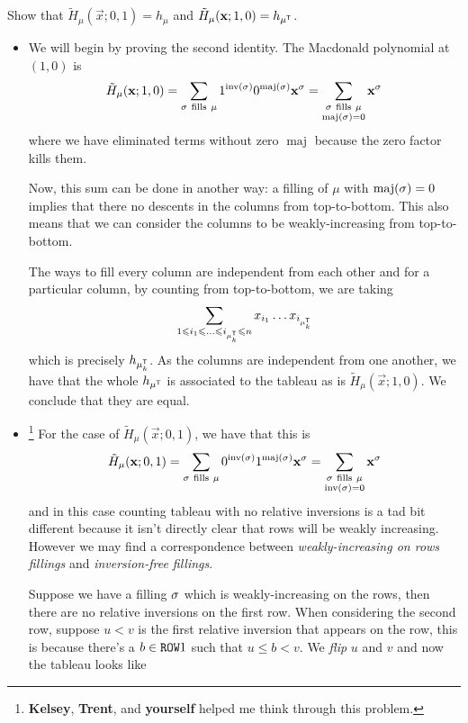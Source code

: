 \documentclass[12pt]{memoir}
\DeclareMathOperator{\inv}{inv}
\DeclareMathOperator{\maj}{maj}
\begin{document}
\begin{Ej}[Exercise 7.b]
    Show that $\tilde{H}_\mu(\vec{x};0,1)=h_\mu$ and $\tilde{H}_\mu(\mathbf{x};1,0)=h_{\mu^{\mathsf{T}}}$.
\end{Ej}

\begin{ptcbr}
    \begin{itemize}
        \item We will begin by proving the second identity. The Macdonald polynomial at $(1,0)$ is 
        $$\tilde{H}_\mu(\vec{x};1,0)=\sum_{\sg\ \text{fills}\ \mu}1^{\inv(\sg)}0^{\maj(\sg)}\vec{x}^\sg=\sum_{\substack{\sg\ \text{fills}\ \mu\\\maj(\sg)=0}}\vec{x}^\sg$$
        where we have eliminated terms without zero $\maj$ because the zero factor kills them.\par 
        Now, this sum can be done in another way: a filling of $\mu$ with $\maj(\sg)=0$ implies that there no descents in the columns from top-to-bottom. This also means that we can consider the columns to be weakly-increasing from top-to-bottom.\par 
        The ways to fill every column are independent from each other and for a particular column, by counting from top-to-bottom, we are taking 
        $$\sum_{1\leq i_1\leq\dots\leq i_{\mu^\sT_k}\leq n}x_{i_1}\dots x_{i_{\mu^\sT_k}}$$
        which is precisely $h_{\mu^{\mathsf{T}}_k}$. As the columns are independent from one another, we have that the whole $h_{\mu^{\mathsf{T}}}$ is associated to the tableau as is $\tilde{H}_\mu(\vec{x};1,0)$. We conclude that they are equal.
        \item \footnote{\textbf{Kelsey}, \textbf{Trent}, and \textbf{yourself} helped me think through this problem.} For the case of $\tilde{H}_\mu(\vec{x};0,1)$, we have that this is 
        $$\tilde{H}_\mu(\vec{x};0,1)=\sum_{\sg\ \text{fills}\ \mu}0^{\inv(\sg)}1^{\maj(\sg)}\vec{x}^\sg=\sum_{\substack{\sg\ \text{fills}\ \mu\\\inv(\sg)=0}}\vec{x}^\sg$$
        and in this case counting tableau with no relative inversions is a tad bit different because it isn't directly clear that rows will be weakly increasing. However we may find a correspondence between \emph{weakly-increasing on rows fillings} and \emph{inversion-free fillings}.\par 
        Suppose we have a filling $\sigma$ which is weakly-increasing on the rows, then there are no relative inversions on the first row. When considering the second row, suppose $u<v$ is the first relative inversion that appears on the row, this is because there's a $b\in\texttt{ROW}1$ such that $u\leq b <v$. We \emph{flip} $u$ and $v$ and now the tableau looks like 

\end{itemize}
\end{ptcbr}
\end{document}
